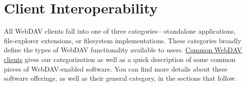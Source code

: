 \section{Client Interoperability}\label{svn.webdav.clients}

All WebDAV clients fall into one of three categories---standalone
applications, file-explorer extensions, or filesystem implementations.
These categories broadly define the types of WebDAV functionality
available to users. \hyperref[svn.webdav.clients.tbl-1]{Common WebDAV
clients} gives our categorization as well as a quick description of some
common pieces of WebDAV-enabled software. You can find more details
about these software offerings, as well as their general category, in
the sections that follow.

